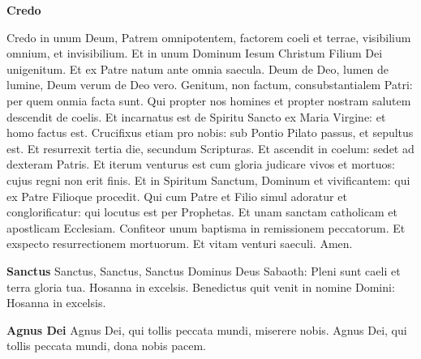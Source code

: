 \documentclass[11pt, ngermanm, titlepage]{article}
\begin{document}
\begin{multicols}{2}
	\textbf{Credo}\newline
	
	Credo in unum Deum, Patrem omnipotentem, factorem coeli et terrae, visibilium omnium, et invisibilium.\newline
	Et in unum Dominum Iesum Christum Filium Dei unigenitum.\newline
	Et ex Patre natum ante omnia saecula.\newline
	Deum de Deo, lumen de lumine, Deum verum de Deo vero.\newline
	Genitum, non factum, consubstantialem Patri: per quem onmia facta sunt.\newline
	Qui propter nos homines et propter nostram salutem descendit de coelis.\newline
	Et incarnatus est de Spiritu Sancto ex Maria Virgine:\newline
	et homo factus est.\newline
	Crucifixus etiam pro nobis: sub Pontio Pilato passus, et sepultus est.\newline
	Et resurrexit tertia die, secundum Scripturas.\newline
	Et ascendit in coelum: sedet ad dexteram Patris.\newline
	Et iterum venturus est cum gloria judicare vivos et mortuos:\newline
	cujus regni non erit finis.\newline
	Et in Spiritum Sanctum, Dominum et vivificantem:\newline
	qui ex Patre Filioque procedit.\newline
	Qui cum Patre et Filio simul adoratur et conglorificatur:\newline
	qui locutus est per Prophetas.\newline
	Et unam sanctam catholicam et apostlicam Ecclesiam.\newline
	Confiteor unum baptisma in remissionem peccatorum.\newline
	Et exspecto resurrectionem mortuorum.\newline
	Et vitam venturi saeculi. Amen.\newline
	
	\textbf{Sanctus}\newline
	Sanctus, Sanctus, Sanctus Dominus Deus Sabaoth:\newline
	Pleni sunt caeli et terra gloria tua.\newline
	Hosanna in excelsis.\newline
	Benedictus quit venit in nomine Domini:\newline
	Hosanna in excelsis.\newline
	
	\textbf{Agnus Dei}\newline
	Agnus Dei, qui tollis peccata mundi, miserere nobis.\newline
	Agnus Dei, qui tollis peccata mundi, dona nobis pacem.\newline
		
	\end{multicols}
	
\end{document}
